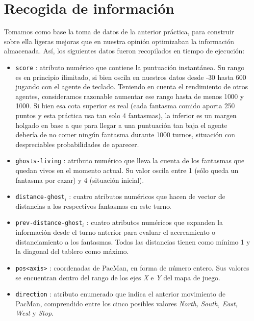 \documentclass[12pt]{article}
\begin{document}
\newpage
\section{Recogida de información}


Tomamos como base la toma de datos de la anterior práctica, para construir sobre ella ligeras mejoras que en nuestra opinión optimizaban la información almacenada. Así, los siguientes datos fueron recopilados en tiempo de ejecución:

\begin{itemize}
    \item \texttt{score} : atributo numérico que contiene la puntuación instantánea. Su rango es en principio ilimitado, si bien oscila en nuestros datos desde -30 hasta 600 jugando con el agente de teclado. Teniendo en cuenta el rendimiento de otros agentes, consideramos razonable aumentar ese rango hasta de menos 1000 y 1000. Si bien esa cota superior es real (cada fantasma comido aporta 250 puntos y esta práctica usa tan solo 4 fantasmas), la inferior es un margen holgado en base a que para llegar a una puntuación tan baja el agente debería de no comer ningún fantasma durante 1000 turnos, situación con despreciables probabilidades de aparecer.
    \item \texttt{ghosts-living} : atributo numérico que lleva la cuenta de los fantasmas que quedan vivos en el momento actual. Su valor oscila entre 1 (sólo queda un fantasma por cazar) y 4 (situación inicial).
    \item \texttt{distance-ghost}$_{i}$ : cuatro atributos numéricos que hacen de vector de distancias a los respectivos fantasmas en este turno.
    \item \texttt{prev-distance-ghost}$_{i}$ : cuatro atributos numéricos que expanden la información desde el turno anterior para evaluar el acercamiento o distanciamiento a los fantasmas. Todas las distancias tienen como mínimo 1 y la diagonal del tablero como máximo.
    \item \texttt{pos\textless axis\textgreater} : coordenadas de PacMan, en forma de número entero. Sus valores se encuentran dentro del rango de los ejes \textit{X} e \textit{Y} del mapa de juego.
    \item \texttt{direction} : atributo enumerado que indica el anterior movimiento de PacMan, comprendido entre los cinco posibles valores \textit{North, South, East, West} y \textit {Stop}.

\end{itemize}
\end{document}
